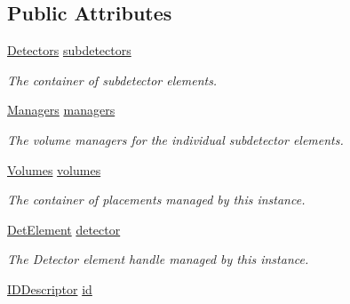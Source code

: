 \subsection*{Public Attributes}
\begin{DoxyCompactItemize}
\item 
\hyperlink{class_d_d4hep_1_1_geometry_1_1_volume_manager_object_a3148ed79d5f6e5175060519838dbad38}{Detectors} \hyperlink{class_d_d4hep_1_1_geometry_1_1_volume_manager_object_aaf80d4d14783bbcdc05eefe7d35519dc}{subdetectors}
\begin{DoxyCompactList}\small\item\em The container of subdetector elements. \item\end{DoxyCompactList}\item 
\hyperlink{class_d_d4hep_1_1_geometry_1_1_volume_manager_object_ad98004850761b06cd3a81c68cdcc0087}{Managers} \hyperlink{class_d_d4hep_1_1_geometry_1_1_volume_manager_object_aff0c698fcc27fa3778734a5c5bd6074f}{managers}
\begin{DoxyCompactList}\small\item\em The volume managers for the individual subdetector elements. \item\end{DoxyCompactList}\item 
\hyperlink{class_d_d4hep_1_1_geometry_1_1_volume_manager_object_a6bbeb958237bc33c7228abada088f6a1}{Volumes} \hyperlink{class_d_d4hep_1_1_geometry_1_1_volume_manager_object_a7ba195782a138b7e47a66389c5845ae6}{volumes}
\begin{DoxyCompactList}\small\item\em The container of placements managed by this instance. \item\end{DoxyCompactList}\item 
\hyperlink{class_d_d4hep_1_1_geometry_1_1_det_element}{DetElement} \hyperlink{class_d_d4hep_1_1_geometry_1_1_volume_manager_object_a998bff824dead1dfec1642f57eae9117}{detector}
\begin{DoxyCompactList}\small\item\em The Detector element handle managed by this instance. \item\end{DoxyCompactList}\item 
\hyperlink{class_d_d4hep_1_1_geometry_1_1_i_d_descriptor}{IDDescriptor} \hyperlink{class_d_d4hep_1_1_geometry_1_1_volume_manager_object_a34cf251ba79ecddf50f9fdaf50265968}{id}

\end{DoxyCompactItemize}
